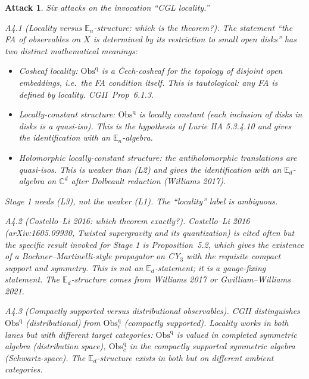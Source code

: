 \documentclass[11pt]{article}
\newtheorem*{attack}{Attack}
\theoremstyle{definition}
\providecommand{\CC}{\mathbb{C}}
\providecommand{\Obs}{\mathrm{Obs}}
\begin{document}
\begin{attack}
Six attacks on the invocation ``CGL locality.''

\emph{A4.1 (Locality versus $\mathbb{E}_n$-structure: which is the theorem?).}
The statement ``the FA of observables on $X$ is determined by its
restriction to small open disks'' has two distinct mathematical
meanings:
\begin{itemize}[leftmargin=2em]
  \item[(L1)] \emph{Cosheaf locality}: $\Obs^{\mathrm{q}}$ is a
              \v{C}ech-cosheaf for the topology of disjoint open
              embeddings, i.e.\ the FA condition itself. This is
              tautological: any FA is defined by locality. CGII~Prop~6.1.3.
  \item[(L2)] \emph{Locally-constant structure}: $\Obs^{\mathrm{q}}$ is
              locally constant (each inclusion of disks in disks is a
              quasi-iso). This is the hypothesis of Lurie HA 5.3.4.10
              and gives the identification with an
              $\mathbb{E}_n$-algebra.
  \item[(L3)] \emph{Holomorphic locally-constant structure}: the
              antiholomorphic translations are quasi-isos. This is
              weaker than (L2) and gives the identification with an
              $\mathbb{E}_d$-algebra on $\CC^d$ after Dolbeault
              reduction (Williams 2017).
\end{itemize}
Stage 1 needs (L3), not the weaker (L1). The ``locality'' label is
ambiguous.

\emph{A4.2 (Costello--Li 2016: which theorem exactly?).}
Costello--Li 2016 (\emph{arXiv:1605.09930, Twisted supergravity and
its quantization}) is cited often but the specific result invoked
for Stage 1 is Proposition~5.2, which gives the existence of a
Bochner--Martinelli-style propagator on CY$_3$ with the requisite
compact support and symmetry. This is not an $\mathbb{E}_d$-statement;
it is a gauge-fixing statement. The $\mathbb{E}_d$-structure comes
from Williams 2017 or Gwilliam--Williams 2021.

\emph{A4.3 (Compactly supported versus distributional observables).}
CGII distinguishes $\Obs^{\mathrm{q}}$ (distributional) from
$\Obs^{\mathrm{q}}_c$ (compactly supported). Locality works in both
lanes but with different target categories: $\Obs^{\mathrm{q}}$ is
valued in \emph{completed} symmetric algebra (distribution space),
$\Obs^{\mathrm{q}}_c$ in the compactly supported symmetric algebra
(Schwartz-space). The $\mathbb{E}_d$-structure exists in both but on
different ambient categories.


\end{attack}
\end{document}
